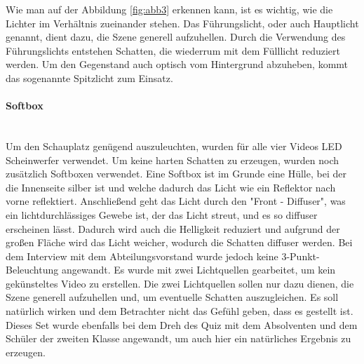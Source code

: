Wie man auf der Abbildung \ref{fig:abb3} erkennen kann, ist es wichtig, wie die Lichter im Verhältnis zueinander stehen. Das Führungslicht, oder auch Hauptlicht genannt, dient dazu, die Szene generell aufzuhellen. Durch die Verwendung des Führungslichts entstehen Schatten, die wiederrum mit dem Fülllicht reduziert werden. Um den Gegenstand auch optisch vom Hintergrund abzuheben, kommt das sogenannte Spitzlicht zum Einsatz. \citep{lichter}
\paragraph{Softbox}
\leavevmode \\
Um den Schauplatz genügend auszuleuchten, wurden für alle vier Videos LED Scheinwerfer verwendet. Um keine harten Schatten zu erzeugen, wurden noch zusätzlich Softboxen verwendet.\newline
Eine Softbox ist im Grunde eine Hülle, bei der die Innenseite silber ist und welche dadurch das Licht wie ein Reflektor nach vorne reflektiert. Anschließend geht das Licht durch den "Front - Diffuser", was
ein lichtdurchlässiges Gewebe ist, der das Licht streut, und es so diffuser erscheinen lässt. Dadurch wird auch die Helligkeit reduziert und aufgrund der großen Fläche wird das Licht weicher, wodurch die Schatten diffuser werden.\citep{softbox}\newline
Bei dem Interview mit dem Abteilungsvorstand wurde jedoch keine 3-Punkt-Beleuchtung angewandt. Es wurde mit zwei Lichtquellen gearbeitet, um kein gekünsteltes Video zu erstellen. Die zwei Lichtquellen sollen nur dazu dienen, die Szene generell aufzuhellen und, um eventuelle Schatten auszugleichen. Es soll natürlich wirken und dem Betrachter nicht das Gefühl geben, dass es gestellt ist.  Dieses Set wurde ebenfalls bei dem Dreh des Quiz mit dem Absolventen und dem Schüler der zweiten Klasse angewandt, um auch hier ein natürliches Ergebnis zu erzeugen.